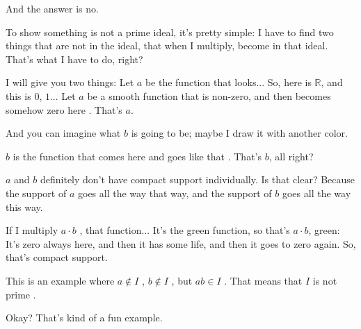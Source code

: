 \begin{speech}[01:05:25 - 01:07:17]
And the answer is no. 

To show something is not a prime ideal, it's pretty simple: I have to find two things that are not in the ideal, that when I multiply, become in that ideal. That's what I have to do, right?

I will give you two things: Let $a$ be the function that looks... So, here is $\mathbb{R}$, and this is $0$, $1$... Let $a$ be a smooth function that is non-zero, and then becomes somehow zero here . That's $a$.

And you can imagine what $b$ is going to be; maybe I draw it with another color.

$b$ is the function that comes here and goes like that . That's $b$, all right?

$a$ and $b$ definitely don't have compact support individually. Is that clear? Because the support of $a$ goes all the way that way, and the support of $b$ goes all the way this way.

If I multiply $a \cdot b$ , that function... It's the green function, so that's $a \cdot b$, green: It's zero always here, and then it has some life, and then it goes to zero again. So, that's compact support.

This is an example where $a \notin I$ , $b \notin I$ , but $ab \in I$ . That means that $I$ is not prime .

Okay? That's kind of a fun example.
\end{speech}

